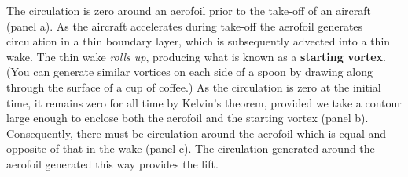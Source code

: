 \documentclass[twoside,a4paper,11pt]{report}
\begin{document}
The circulation is zero around an aerofoil prior to the take-off of an 
aircraft (panel a). As the aircraft accelerates during take-off the aerofoil 
generates circulation in a thin boundary layer, which is subsequently 
advected into a thin wake. The thin wake \textit{rolls up}, producing what is known as a 
\textbf{starting vortex}. (You can generate similar vortices on each side of 
a spoon by drawing along through the surface of a cup of coffee.) As the 
circulation is zero at the initial time, it remains zero for all time by 
Kelvin's theorem, provided we take a contour large enough to enclose both 
the aerofoil and the starting vortex (panel b). Consequently, there must be 
circulation around the aerofoil which is equal and opposite of that in the 
wake (panel c). The circulation generated around the aerofoil generated this 
way provides the lift.

\begin{figure}
\begin{center}
\end{center}
\label{fig10}
\end{figure}
\end{document}
